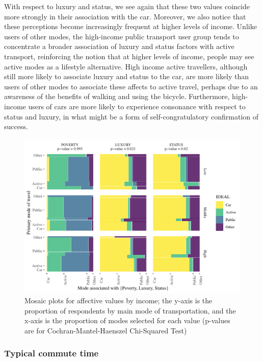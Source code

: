 \documentclass[]{elsarticle} %
\makeatletter
\def\maxwidth{\ifdim\Gin@nat@width>\linewidth\linewidth
\else\Gin@nat@width\fi}
\let\Oldincludegraphics\includegraphics
\renewcommand{\includegraphics}[1]{\Oldincludegraphics[width=\maxwidth]{#1}}
\makeatother
\begin{document}
With respect to luxury and status, we see again that these two values
coincide more strongly in their association with the car. Moreover, we
also notice that these perceptions become increasingly frequent at
higher levels of income. Unlike users of other modes, the high-income
public transport user group tends to concentrate a broader association
of luxury and status factors with active transport, reinforcing the
notion that at higher levels of income, people may see active modes as a
lifestyle alternative. High income active travellers, although still
more likely to associate luxury and status to the car, are more likely
than users of other modes to associate these affects to active travel,
perhaps due to an awareness of the benefits of walking and using the
bicycle. Furthermore, high-income users of cars are more likely to
experience consonance with respect to status and luxury, in what might
be a form of self-congratulatory confirmation of success.

\begin{figure}
\centering
\includegraphics{Dissonance_Santiago_v1_files/figure-latex/figure-mosaic-plots-by-attribute-and-income-1.pdf}
\caption{\label{fig:mosaic-plots-by-income}Mosaic plots for affective
values by income; the y-axis is the proportion of respondents by main
mode of transportation, and the x-axis is the proportion of modes
selected for each value (p-values are for Cochran-Mantel-Haenszel
Chi-Squared Test)}
\end{figure}

\hypertarget{typical-commute-time-1}{%
\subsubsection{Typical commute time}\label{typical-commute-time-1}}
\end{document}
